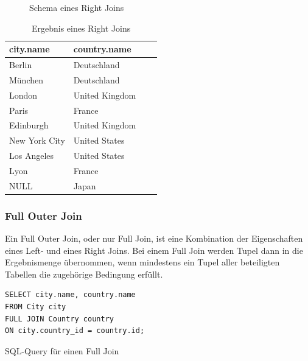 \documentclass[a4paper]{article}
\begin{document}
\begin{minipage}{\textwidth}
\begin{minipage}[b]{0.49\textwidth}
\begin{figure}[H]
\caption{Schema eines Right Joins}
\end{figure}
\end{minipage}
\hfill
\begin{minipage}[b]{0.49\textwidth}
\begin{table}[H]
\centering
  \begin{tabular}{| l | l | l | l |}
    \hline
    city.name & country.name\\ \hline
    \hline
   Berlin & Deutschland \\ \hline
   München & Deutschland \\ \hline
   London & United Kingdom \\ \hline
   Paris & France \\ \hline
   Edinburgh & United Kingdom \\ \hline
   New York City & United States \\ \hline
   Los Angeles & United States \\ \hline
   Lyon & France \\ \hline
   NULL & Japan \\ \hline
  \end{tabular}
\caption{Ergebnis eines Right Joins}
\label{tab:right-join}
\end{table}
\end{minipage}
\end{minipage}

\newpage
\subsubsection{Full Outer Join}
Ein Full Outer Join, oder nur Full Join, ist eine Kombination der Eigenschaften eines Left- und eines Right Joins. Bei einem Full Join werden Tupel dann in die Ergebnismenge übernommen, wenn mindestens ein Tupel aller beteiligten Tabellen die zugehörige Bedingung erfüllt.

\begin{listing}[H]
\begin{verbatim}
SELECT city.name, country.name 
FROM City city
FULL JOIN Country country 
ON city.country_id = country.id;
\end{verbatim}
\caption{SQL-Query für einen Full Join}
\label{lst:full-join}
\end{listing}
\end{document}
